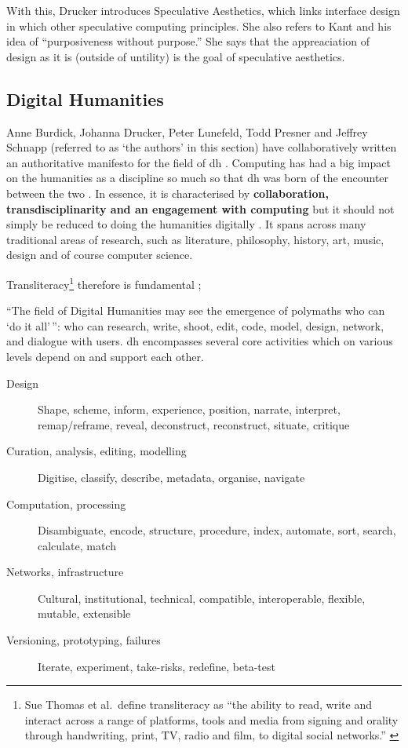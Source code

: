 With this, Drucker introduces Speculative Aesthetics, which links interface design in which other speculative computing principles. She also refers to Kant and his idea of ``purposiveness without purpose.'' She says that the appreaciation of design as it is (outside of untility) is the goal of speculative aesthetics.


\subsection{Digital Humanities}

Anne Burdick, Johanna Drucker, Peter Lunefeld, Todd Presner and Jeffrey Schnapp (referred to as `the authors' in this section) have collaboratively written an authoritative manifesto for the field of \gls{dh} \citep{Burdick2012}. Computing has had a big impact on the humanities as a discipline so much so that \gls{dh} was born of the encounter between the two \citep[p.3]{Burdick2012}. In essence, it is characterised by \textbf{collaboration, transdisciplinarity and an engagement with computing} \citep[p.122]{Burdick2012} but it should not simply be reduced to doing the humanities digitally \citep[p.101]{Burdick2012}. It spans across many traditional areas of research, such as literature, philosophy, history, art, music, design and of course computer science.

\begin{draft}
  Transliteracy\footnote{Sue Thomas et al.\ define transliteracy as ``the ability to read, write and interact across a range of platforms, tools and media from signing and orality through handwriting, print, TV, radio and film, to digital social networks.'' \citep{Thomas2007}} therefore is fundamental \citep{Thomas2007};
\end{draft}

``The field of Digital Humanities may see the emergence of polymaths who can `do it all'\,'': who can research, write, shoot, edit, code, model, design, network, and dialogue with users. \citep[p.15]{Burdick2012} \gls{dh} encompasses several core activities which on various levels depend on and support each other.

\begin{description}
  \item [Design] Shape, scheme, inform, experience, position, narrate,
  					interpret, remap/reframe, reveal, deconstruct, reconstruct,
  					situate, critique
  \item [Curation, analysis, editing, modelling] Digitise, classify, describe, metadata, organise, navigate
  \item [Computation, processing] Disambiguate, encode, structure, procedure, index, automate, sort, search, calculate, match
  \item [Networks, infrastructure] Cultural, institutional, technical, compatible, interoperable, flexible, mutable, extensible
  \item [Versioning, prototyping, failures]	Iterate, experiment, take-risks, redefine, beta-test
\end{description}

